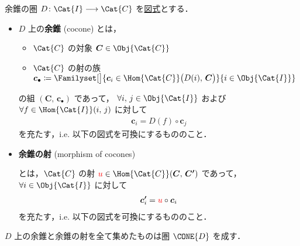 \documentclass[TQFT_main]{subfiles}
\begin{document}
\begin{mydef}[label=def:coCone, breakable]{余錐の圏}
	$D \colon \Cat{I} \lto \Cat{C}$ を\hyperref[def:diagram]{図式}とする．
	\begin{itemize}
		\item $D$ 上の\textbf{余錐} (cocone) とは，
		\begin{itemize}
			\item $\Cat{C}$ の対象 $\bm{C} \in \Obj{\Cat{C}}$
			\item $\Cat{C}$ の射の族 $\bm{c}_\bullet \coloneqq \Familyset[\big]{\bm{c}_i \in \Hom{\Cat{C}}\bigl(D(i),\, \bm{C}\bigr)}{i \in \Obj{\Cat{I}}}$
		\end{itemize}
		の組 $(\bm{C},\, \bm{c}_\bullet)$ であって，
		$\forall i,\, j \in \Obj{\Cat{I}}$ および $\forall f \in \Hom{\Cat{I}}(i,\, j)$ に対して
		\begin{align}
			\bm{c}_i = D(f) \circ \bm{c}_j
		\end{align}
		を充たす，i.e. 以下の図式を可換にするもののこと．
		\begin{center}
		\end{center}
		\item \textbf{余錐の射} (morphism of cocones) 
		\begin{center}
		\end{center}
		とは，$\Cat{C}$ の射 $\textcolor{red}{u} \in \Hom{\Cat{C}} (\bm{C},\, \bm{C'})$ であって，$\forall i \in \Obj{\Cat{I}}$ に対して
		\begin{align}
			\bm{c'}_i = \textcolor{red}{u} \circ \bm{c}_i
		\end{align}
		を充たす，i.e. 以下の図式を可換にするもののこと．
		\begin{center}
		\end{center}
	\end{itemize}
	$D$ 上の余錐と余錐の射を全て集めたものは圏 $\CONE{D}$ を成す．
\end{mydef}
\end{document}
